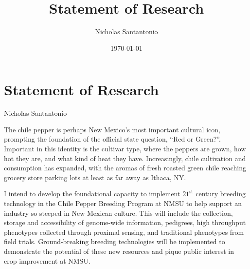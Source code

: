 \documentclass[11pt]{article}
\title{Statement of Research}
\author{Nicholas Santantonio}
\date{\today}
\begin{document}
\section*{\centering Statement of Research}
\begin{center} Nicholas Santantonio \end{center}







\noindent The chile pepper is perhaps New Mexico's most important cultural icon, prompting the foundation of the official state question, ``Red or Green?''. Important in this identity is the cultivar type, where the peppers are grown, how hot they are, and what kind of heat they have. Increasingly, chile cultivation and consumption has expanded, with the aromas of fresh roasted green chile reaching grocery store parking lots at least as far away as Ithaca, NY. %

I intend to develop the foundational capacity to implement $21^\text{st}$ century breeding technology in the Chile Pepper Breeding Program at NMSU to help support an industry so steeped in New Mexican culture. This will include the collection, storage and accessibility of genome-wide information, pedigrees, high throughput phenotypes collected through proximal sensing, and traditional phenotypes from field trials. Ground-breaking breeding technologies will be implemented to demonstrate the potential of these new resources and pique public interest in crop improvement at NMSU.  
\end{document}
